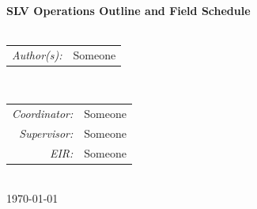 \begin{titlepage}

\HRule \\[0.6cm]
{ \Huge \bfseries 
SLV Operations Outline and Field Schedule
}\\[0.4cm] 

\HRule \\[1cm]
 
\begin{minipage}{0.4\textwidth}
\begin{flushleft} \large
	\begin{tabular} {r l} 
        \emph{Author(s):} & Someone	\\
	\end{tabular}
\end{flushleft}
\end{minipage}
~
\begin{minipage}{0.4\textwidth}
\begin{flushright} \large
	\begin{tabular} {r l} 
		\emph{Coordinator:} & Someone 		\\
		\emph{Supervisor:}  & Someone 		\\
		\emph{EIR:}         & Someone  		        \\
	\end{tabular}
\end{flushright}
\end{minipage}\\[2cm]


{\large \today}\\[2cm] %

\vfill %

\end{titlepage}
